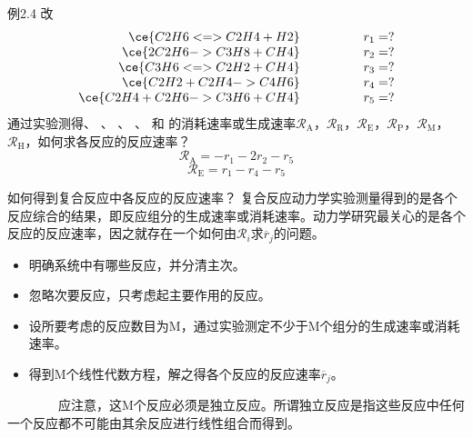 \begin{frame}[t]
    \frametitle{}
    \vspace{-5pt}
    \begin{block}{例2.4 改}
		$$\begin{array}{r}
		\ce{C2H6 <=> C2H4 + H2}\\
		\ce{2C2H6 -> C3H8 + CH4}\\
		\ce{C3H6 <=> C2H2 + CH4}\\
		\ce{C2H2 + C2H4 -> C4H6}\\
		\ce{C2H4 + C2H6 -> C3H6 + CH4}
	\end{array}~~~~~~~~~~~~
	\begin{array}{l}
		r_1=?\\
		r_2=?\\
		r_3=?\\
		r_4=?\\
		r_5=?
	\end{array}$$
    通过实验测得、 、 、 、 和 的消耗速率或生成速率$\mathcal{R}_\mathrm{A}$，$\mathcal{R}_\mathrm{R}$，$\mathcal{R}_\mathrm{E}$，$\mathcal{R}_\mathrm{P}$，$\mathcal{R}_\mathrm{M}$，$\mathcal{R}_\mathrm{H}$，如何求各反应的反应速率？
    \tcblower
    \pause
        \[
            \mathcal{R}_\mathrm{A} = -r_\mathrm{1} - 2r_\mathrm{2} - r_\mathrm{5}
        \]
        \[
            \mathcal{R}_\mathrm{E} = r_\mathrm{1} - r_\mathrm{4} - r_\mathrm{5}
        \]
    \end{block}
\end{frame}


\begin{frame}{如何得到复合反应中各反应的反应速率？}
	复合反应动力学实验测量得到的是各个反应综合的结果，即反应组分的生成速率或消耗速率。动力学研究最关心的是各个反应的反应速率，因之就存在一个如何由$\mathcal{R}_i$求$\overline{r}_j$的问题。
	\begin{itemize}
		\item 明确系统中有哪些反应，并分清主次。
		\item 忽略次要反应，只考虑起主要作用的反应。
		\item 设所要考虑的反应数目为M，通过实验测定不少于M个组分的生成速率或消耗速率。
		\item 得到M个线性代数方程，解之得各个反应的反应速率$\overline{r}_j$。
	\end{itemize}
	~~~~~~~~应注意，这M个反应必须是独立反应。所谓独立反应是指这些反应中任何一个反应都不可能由其余反应进行线性组合而得到。
\end{frame}



